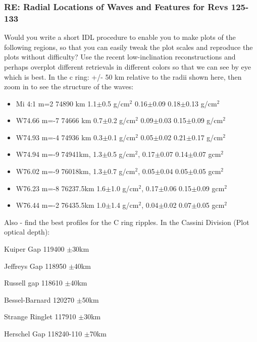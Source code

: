 \documentclass[crop=false,class=book]{standalone}
\begin{document}
\subsubsection{\footnotesize RE: Radial Locations of Waves and Features for Revs 125-133}
Would you write a short IDL procedure to enable you to make plots of the following regions, so that you can easily tweak the plot scales and reproduce the plots without difficulty? Use the recent low-inclination reconstructions and perhaps overplot different retrievals in different colors so that we can see by eye which is best. In the c ring: +/- 50 km relative to the radii shown here, then zoom in to see the structure of the waves:
\begin{itemize}
    \item Mi 4:1 m=2  74890 km  1.1$\pm$0.5 g/$\textrm{cm}^2$  0.16$\pm$0.09  0.18$\pm$0.13 g/$\textrm{cm}^2$
    \item W74.66 m=-7 74666 km  0.7$\pm$0.2 g/$\textrm{cm}^2$  0.09$\pm$0.03  0.15$\pm$0.09 g/$\textrm{cm}^2$
    \item W74.93 m=-4 74936 km  0.3$\pm$0.1 g/$\textrm{cm}^2$  0.05$\pm$0.02  0.21$\pm$0.17 g/$\textrm{cm}^2$
    \item W74.94 m=-9 74941km,  1.3$\pm$0.5 g/$\textrm{cm}^2$, 0.17$\pm$0.07  0.14$\pm$0.07 g$\textrm{cm}^2$
    \item W76.02 m=-9 76018km,  1.3$\pm$0.7 g/$\textrm{cm}^2$, 0.05$\pm$0.04  0.05$\pm$0.05 g$\textrm{cm}^2$
    \item W76.23 m=-8 76237.5km 1.6$\pm$1.0 g/$\textrm{cm}^2$, 0.17$\pm$0.06  0.15$\pm$0.09 g$\textrm{cm}^2$
    \item W76.44 m=-2 76435.5km 1.0$\pm$1.4 g/$\textrm{cm}^2$, 0.04$\pm$0.02  0.07$\pm$0.05 g$\textrm{cm}^2$
\end{itemize}
Also - find the best profiles for the C ring ripples. In the Cassini Division (Plot optical depth):
\begin{itemize}
\begin{multicols}{3}
    \item Kuiper Gap 119400 $\pm$30km
    \item Jeffreys Gap 118950 $\pm$40km
    \item Russell gap 118610 $\pm$40km
    \item Bessel-Barnard 120270 $\pm$50km
    \item Strange Ringlet 117910 $\pm$30km
    \item Herschel Gap 118240-110 $\pm$70km
\end{multicols}
\end{itemize}
\end{document}
